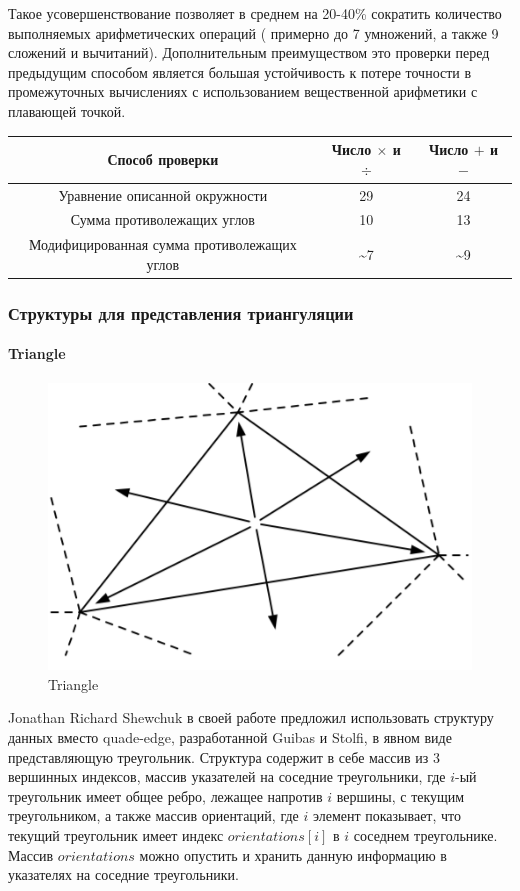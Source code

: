 \documentclass{fefu}
\begin{document}
Такое усовершенствование позволяет в среднем на 20-40\% сократить количество выполняемых арифметических операций (
примерно до 7 умножений, а также 9 сложений и вычитаний). Дополнительным преимуществом это проверки перед предыдущим
способом является большая устойчивость к потере точности в промежуточных вычислениях с использованием вещественной
арифметики с плавающей точкой.
\begin{table}[H]
    \centering
    \begin{center}
        \begin{tabular} { |c|c|c| }
            \hline
            Способ проверки & Число $\times$ и $\div$ & Число $+$ и $-$\\ [0.5ex]
            \hline
            Уравнение описанной окружности & 29 & 24\\
            Сумма противолежащих углов & 10 & 13\\
            Модифицированная сумма противолежащих углов & \textasciitilde 7 & \textasciitilde 9\\
            \hline
        \end{tabular}
    \end{center}
\end{table}
\subsubsection{Структуры для представления триангуляции}
\paragraph{Triangle}
\begin{figure}[H]
    \centering
    \includegraphics{images/TriangleStructure.png}
    \caption{Triangle}
\end{figure}
Jonathan Richard Shewchuk в своей работе \cite{MeshGeneration} предложил использовать структуру данных вместо
quade-edge, разработанной Guibas и Stolfi\cite{QuadEdge}, в явном виде
представляющую треугольник. Структура содержит в себе массив из 3 вершинных индексов, массив указателей на соседние
треугольники, где $i$-ый треугольник имеет общее ребро, лежащее напротив $i$ вершины, с текущим треугольником, а также
массив ориентаций, где $i$ элемент показывает, что текущий треугольник имеет индекс $orientations[i]$ в $i$ соседнем
треугольнике. Массив $orientations$ можно опустить и хранить данную информацию в указателях на соседние треугольники.
\end{document}

